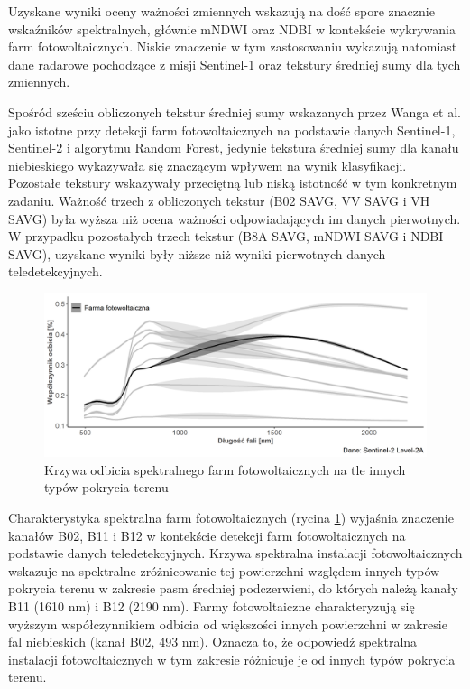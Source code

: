 \documentclass{amuthesis}
\begin{document}
Uzyskane wyniki oceny ważności zmiennych wskazują na dość spore znacznie
wskaźników spektralnych, głównie mNDWI oraz NDBI w kontekście wykrywania
farm fotowoltaicznych. Niskie znaczenie w tym zastosowaniu wykazują
natomiast dane radarowe pochodzące z misji Sentinel-1 oraz tekstury
średniej sumy dla tych zmiennych.

Spośród sześciu obliczonych tekstur średniej sumy wskazanych przez Wanga
et al. \autocite*{wang_2022_pv} jako istotne przy detekcji farm
fotowoltaicznych na podstawie danych Sentinel-1, Sentinel-2 i algorytmu
Random Forest, jedynie tekstura średniej sumy dla kanału niebieskiego
wykazywała się znaczącym wpływem na wynik klasyfikacji. Pozostałe
tekstury wskazywały przeciętną lub niską istotność w tym konkretnym
zadaniu. Ważność trzech z obliczonych tekstur (B02 SAVG, VV SAVG i VH
SAVG) była wyższa niż ocena ważności odpowiadających im danych
pierwotnych. W przypadku pozostałych trzech tekstur (B8A SAVG, mNDWI
SAVG i NDBI SAVG), uzyskane wyniki były niższe niż wyniki pierwotnych
danych teledetekcyjnych.

\begin{figure}[t]

{\centering \includegraphics[width=1\textwidth,height=\textheight]{figures/spectral_curves_plot2.png}

}

\caption{\label{fig-rycina-spectral-curves}Krzywa odbicia spektralnego
farm fotowoltaicznych na tle innych typów pokrycia terenu}

\end{figure}

Charakterystyka spektralna farm fotowoltaicznych (rycina
\ref{fig-rycina-spectral-curves}) wyjaśnia znaczenie kanałów B02, B11 i
B12 w kontekście detekcji farm fotowoltaicznych na podstawie danych
teledetekcyjnych. Krzywa spektralna instalacji fotowoltaicznych wskazuje
na spektralne zróżnicowanie tej powierzchni względem innych typów
pokrycia terenu w zakresie pasm średniej podczerwieni, do których należą
kanały B11 (1610 nm) i B12 (2190 nm). Farmy fotowoltaiczne
charakteryzują się wyższym współczynnikiem odbicia od większości innych
powierzchni w zakresie fal niebieskich (kanał B02, 493 nm). Oznacza to,
że odpowiedź spektralna instalacji fotowoltaicznych w tym zakresie
różnicuje je od innych typów pokrycia terenu.
\end{document}

